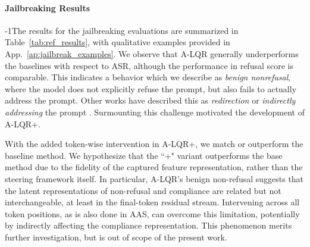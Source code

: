 \documentclass{article}
\theoremstyle{plain}
\theoremstyle{definition}
\theoremstyle{remark}
\begin{document}
\vspace{-10pt}
\paragraph{Jailbreaking Results} 
\looseness-1The results for the jailbreaking evaluations are summarized in Table~\ref{tab:ref_results}, with qualitative examples provided in App.~\ref{ap:jailbreak_examples}. We observe that A-LQR generally underperforms the baselines with respect to ASR, although the performance in refusal score is comparable. This indicates a behavior which we describe as \textit{benign nonrefusal}, where the model does not explicitly refuse the prompt, but also fails to actually address the prompt. Other works have described this as \textit{redirection} or \textit{indirectly addressing} the prompt \cite{Vu_Nguyen_2025}. Surmounting this challenge motivated the development of A-LQR+. 

With the added token-wise intervention in A-LQR+, we match or outperform the baseline method. 
We hypothesize that the ``+" variant outperforms the base method due to the fidelity of the captured feature representation, rather than the steering framework itself. 
In particular, A-LQR’s benign non-refusal suggests that the latent representations of non-refusal and compliance are related but not interchangeable, at least in the final-token residual stream.
Intervening across all token positions, as is also done in AAS, can overcome this limitation, potentially by indirectly affecting the compliance representation. This phenomenon merits further investigation, but is out of scope of the present work.
\end{document}
